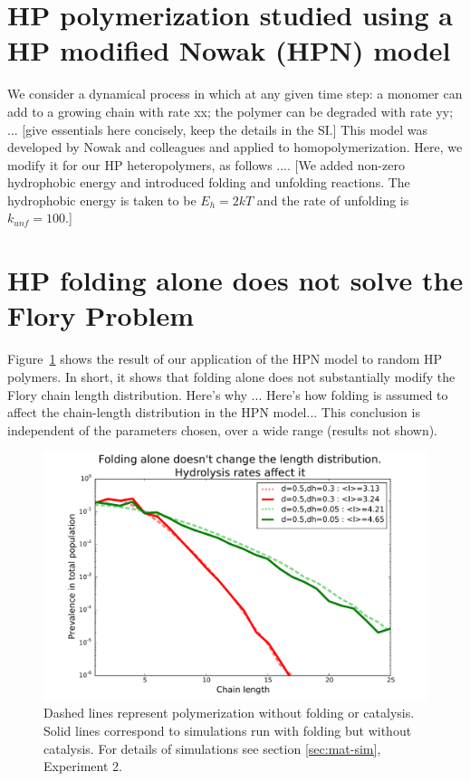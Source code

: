 \documentclass[journal=jacsat,manuscript=article,layout=twocolumn]{achemso}
\begin{document}

\section{HP polymerization studied using a HP modified Nowak (HPN) model}

We consider a dynamical process in which at any given time step: a monomer can add to a growing 
chain with rate xx; the polymer can be degraded with rate yy; ... [give essentials here concisely, 
keep the details in the SI.]  This model was developed by Nowak and colleagues and applied to 
homopolymerization.  Here, we modify it for our HP heteropolymers, as follows ....  [We added 
non-zero hydrophobic energy and introduced folding and unfolding reactions.  The hydrophobic energy 
is taken to be $E_h=2kT$ and the rate of unfolding is $k_{unf}=100$.]


\section{HP folding alone does not solve the Flory Problem}

Figure~\ref{fig:sim.flory-fold} shows the result of our application of the HPN model to random HP 
polymers.  In short, it shows that folding alone does not substantially modify the Flory chain 
length distribution.  Here's why ... Here's how folding is assumed to affect the chain-length 
distribution in the HPN model...   This conclusion is independent of the parameters chosen, over a 
wide range (results not shown).

\begin{figure}[h!]
  \centering
  \includegraphics[width=\columnwidth]{pictures/flory-and-fold.pdf} 
  \caption{Dashed lines represent polymerization without folding or catalysis. Solid lines 
correspond to simulations run with folding but without catalysis. For details of simulations see 
section \ref{sec:mat-sim}, Experiment 2. }
  \label{fig:sim.flory-fold}
\end{figure}
\end{document}
